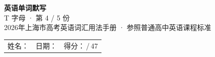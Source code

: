 \documentclass[10pt,a4paper]{article}
\begin{document}
\pagestyle{plain}

\begin{center}
{\LARGE\bfseries 英语单词默写}\\[0.22em]
{\large T 字母 · 第 4 / 5 份}\\[0.18em]
{\small 2026年上海市高考英语词汇用法手册 · 参照普通高中英语课程标准}
\end{center}

\vspace{0.25em}
\noindent\begin{tabular}{@{}p{}@{}p{}@{}p{}@{}}
姓名：\underline{\hspace{2.0cm}} & 日期：\underline{\hspace{2.0cm}} & 得分：\underline{\hspace{1.3cm}}\,/\,47 \\
\end{tabular}

\vspace{0.3em}

\vspace{0.08em}
\end{document}
